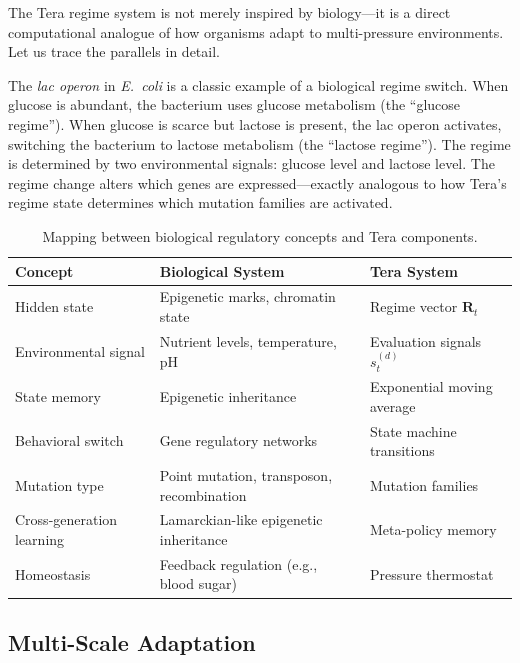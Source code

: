 The Tera regime system is not merely inspired by biology---it is a direct computational analogue of how organisms adapt to multi-pressure environments. Let us trace the parallels in detail.

\begin{bioinsight}
The \emph{lac operon} in \emph{E.~coli} is a classic example of a biological regime switch. When glucose is abundant, the bacterium uses glucose metabolism (the ``glucose regime''). When glucose is scarce but lactose is present, the lac operon activates, switching the bacterium to lactose metabolism (the ``lactose regime''). The regime is determined by two environmental signals: glucose level and lactose level. The regime change alters which genes are expressed---exactly analogous to how Tera's regime state determines which mutation families are activated.
\end{bioinsight}

\begin{table}[H]
\centering
\caption{Mapping between biological regulatory concepts and Tera components.}
\label{tab:bio-mapping}
\begin{tabularx}{\textwidth}{L{3.5cm} Y Y}
\toprule
\textbf{Concept} & \textbf{Biological System} & \textbf{Tera System} \\
\midrule
Hidden state & Epigenetic marks, chromatin state & Regime vector $\mathbf{R}_t$ \\
Environmental signal & Nutrient levels, temperature, pH & Evaluation signals $s_t^{(d)}$ \\
State memory & Epigenetic inheritance & Exponential moving average \\
Behavioral switch & Gene regulatory networks & State machine transitions \\
Mutation type & Point mutation, transposon, recombination & Mutation families \\
Cross-generation learning & Lamarckian-like epigenetic inheritance & Meta-policy memory \\
Homeostasis & Feedback regulation (e.g., blood sugar) & Pressure thermostat \\
\bottomrule
\end{tabularx}
\end{table}

\subsection{Multi-Scale Adaptation}


